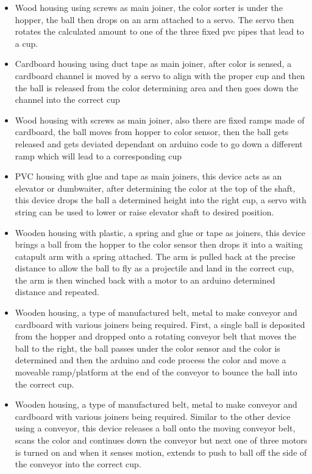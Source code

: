 \documentclass{article}
\begin{document}
\begin{itemize}
    \item   Wood housing using screws as main joiner, the color sorter is under the hopper, the ball then drops on an arm attached to a servo. The servo then rotates the calculated amount to one of the three fixed pvc pipes that lead to a cup.
    \item Cardboard housing using duct tape as main joiner, after color is sensed, a cardboard     channel is moved by a servo to align with the proper cup and then the ball is released from the color determining area and then goes down the channel into the correct cup
    \item Wood housing with screws as main joiner, also there are fixed ramps made of cardboard, the ball moves from hopper to color sensor, then the ball gets released and gets deviated dependant on arduino code to go down a different ramp which will lead to a corresponding cup 
    \item PVC housing with glue and tape as main joiners, this device acts as an elevator or dumbwaiter, after determining the color at the top of the shaft, this device drops the ball a determined height into the right cup, a servo with string can be used to lower or raise elevator shaft to desired position.
    \item Wooden housing with plastic, a spring and glue or tape as joiners, this device brings a ball from the hopper to the color sensor then drops it into a waiting catapult arm with a spring attached. The arm is pulled back at the precise distance to allow the ball to fly as a projectile and land in the correct cup, the arm is then winched back with a motor to an arduino determined distance and repeated.
    \item Wooden housing, a type of manufactured belt, metal to make conveyor and cardboard with various joiners being required. First, a single ball is deposited from the hopper and dropped onto a rotating conveyor belt that moves the ball to the right, the ball passes under the color sensor and the color is determined and then the arduino and code process the color and move a moveable ramp/platform at the end of the conveyor to bounce the ball into the correct cup.
    \item Wooden housing, a type of manufactured belt, metal to make conveyor and cardboard with various joiners being required. Similar to the other device using a conveyor, this device releases a ball onto the moving conveyor belt, scans the color and continues down the conveyor but next one of three motors is turned on and when it senses motion, extends to push to ball off the side of the conveyor into the correct cup.

\end{itemize}
\end{document}
